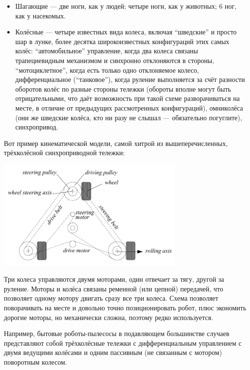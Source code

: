 \documentclass{../../text-style}
\begin{document}
\begin{itemize}
    \item Шагающие --- две ноги, как у людей; четыре ноги, как у животных; 6 ног, как у насекомых.
    \item Колёсные --- четыре известных вида колеса, включая \enquote{шведские} и просто шар в лунке, более десятка широкоизвестных конфигураций этих самых колёс: \enquote{автомобильное} управление, когда два колеса связаны трапециевидным механизмом и синхронно отклоняются в стороны, \enquote{мотоциклетное}, когда есть только одно отклоняемое колесо, дифференциальное (\enquote{танковое}), когда руление выполняется за счёт разности оборотов колёс по разные стороны тележки (обороты вполне могут быть отрицательными, что даёт возможность при такой схеме разворачиваться на месте, в отличие от предыдущих рассмотренных конфигураций), омниколёса (они же шведские колёса, кто ни разу не слышал --- обязательно погуглите), синхропривод.
\end{itemize}

Вот пример кинематической модели, самой хитрой из вышеперечисленных, трёхколёсной синхроприводной тележки:

\begin{center}
    \includegraphics[width=0.7\textwidth]{synchroDrive.png}
\end{center}

Три колеса управляются двумя моторами, один отвечает за тягу, другой за руление.
Моторы и колёса связаны ременной (или цепной) передачей, что позволяет одному мотору двигать сразу все три колеса.
Схема позволяет поворачивать на месте и довольно точно позиционировать робот, плюс экономить дорогие моторы, но механически сложна, поэтому редко используется.

Например, бытовые роботы-пылесосы в подавляющем большинстве случаев представляют собой трёхколёсные тележки с дифференциальным управлением с двумя ведущими колёсами и одним пассивным (не связанным с мотором) поворотным колесом.
\end{document}
